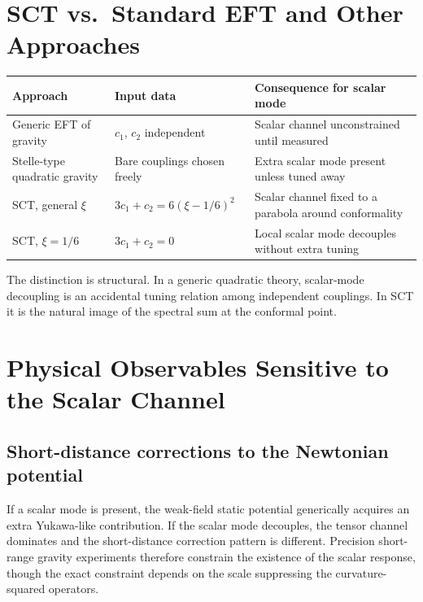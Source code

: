 \documentclass[11pt,a4paper]{article}
\begin{document}
\section{SCT vs.\ Standard EFT and Other Approaches}
\label{sec:comparison}

\begin{center}
\renewcommand{\arraystretch}{1.25}
\begin{tabular}{>{\raggedright\arraybackslash}p{3.1cm} >{\raggedright\arraybackslash}p{4.1cm} >{\raggedright\arraybackslash}p{5.3cm}}
\toprule
\textbf{Approach} & \textbf{Input data} & \textbf{Consequence for scalar mode} \\
\midrule
Generic EFT of gravity & $c_1$, $c_2$ independent & Scalar channel unconstrained until measured \\
Stelle-type quadratic gravity & Bare couplings chosen freely & Extra scalar mode present unless tuned away \\
SCT, general $\xi$ & $3c_1+c_2 = 6(\xi-1/6)^2$ & Scalar channel fixed to a parabola around conformality \\
SCT, $\xi = 1/6$ & $3c_1+c_2 = 0$ & Local scalar mode decouples without extra tuning \\
\bottomrule
\end{tabular}
\end{center}

The distinction is structural.  In a generic quadratic theory, scalar-mode
decoupling is an accidental tuning relation among independent couplings.  In
SCT it is the natural image of the spectral sum at the conformal point.

\section{Physical Observables Sensitive to the Scalar Channel}
\label{sec:observables}

\subsection{Short-distance corrections to the Newtonian potential}

If a scalar mode is present, the weak-field static potential generically
acquires an extra Yukawa-like contribution.  If the scalar mode decouples,
the tensor channel dominates and the short-distance correction pattern is
different.  Precision short-range gravity experiments therefore constrain the
existence of the scalar response, though the exact constraint depends on the
scale suppressing the curvature-squared operators.
\end{document}
